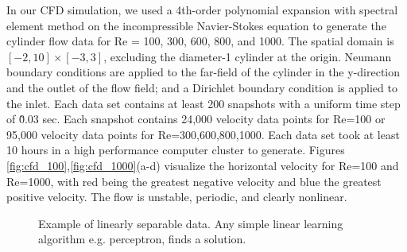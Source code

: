 In our CFD simulation, we used a 4th-order polynomial expansion with spectral element method on the incompressible Navier-Stokes equation to generate the cylinder flow data for Re = 100, 300, 600, 800, and 1000. The spatial domain is $\left[-2,10\right]\times\left[-3,3\right]$, excluding the diameter-1 cylinder at the origin.  Neumann boundary conditions are applied to the far-field of the cylinder in the y-direction and the outlet of the flow field; and a Dirichlet boundary condition is applied to the inlet. Each data set contains at least 200 snapshots with a uniform time step of \~0.03 sec. Each snapshot contains 24,000 velocity data points for Re=100 or 95,000 velocity data points for Re=300,600,800,1000. Each data set took at least 10 hours in a high performance computer cluster to generate. Figures \ref{fig:cfd_100},\ref{fig:cfd_1000}(a-d) visualize the horizontal velocity for Re=100 and Re=1000, with red being the greatest negative velocity and blue the greatest positive velocity. The flow is unstable, periodic, and clearly nonlinear.
\begin{figure}[h]
	\centering
	\caption{Example of linearly separable data. Any simple linear learning algorithm e.g. perceptron, finds a solution.}
	\label{fig:linsep}
\end{figure} 
